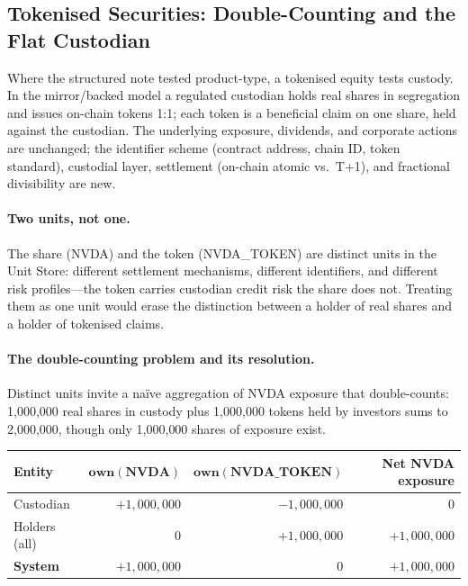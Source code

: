 \subsection{Tokenised Securities: Double-Counting and the Flat Custodian}
\label{sec:cdm-tokenized}

Where the structured note tested product-type, a tokenised equity tests custody. In the mirror/backed model a regulated custodian holds real shares in segregation and issues on-chain tokens 1:1; each token is a beneficial claim on one share, held against the custodian. The underlying exposure, dividends, and corporate actions are unchanged; the identifier scheme (contract address, chain ID, token standard), custodial layer, settlement (on-chain atomic vs.\ T+1), and fractional divisibility are new.

\paragraph{Two units, not one.} The share (NVDA) and the token (NVDA\_TOKEN) are distinct units in the Unit Store: different settlement mechanisms, different identifiers, and different risk profiles---the token carries custodian credit risk the share does not. Treating them as one unit would erase the distinction between a holder of real shares and a holder of tokenised claims.

\paragraph{The double-counting problem and its resolution.} Distinct units invite a na\"ive aggregation of NVDA exposure that double-counts: 1{,}000{,}000 real shares in custody plus 1{,}000{,}000 tokens held by investors sums to 2{,}000{,}000, though only 1{,}000{,}000 shares of exposure exist.

\begin{center}\small
\begin{tabular}{@{}lrrr@{}}
\toprule
\textbf{Entity} & $\mathbf{own(NVDA)}$ & $\mathbf{own(NVDA\_TOKEN)}$ & \textbf{Net NVDA exposure} \\
\midrule
Custodian & $+1{,}000{,}000$ & $-1{,}000{,}000$ & $0$ \\
Holders (all) & $0$ & $+1{,}000{,}000$ & $+1{,}000{,}000$ \\
\midrule
\textbf{System} & $+1{,}000{,}000$ & $0$ & $+1{,}000{,}000$ \\
\bottomrule
\end{tabular}
\end{center}

